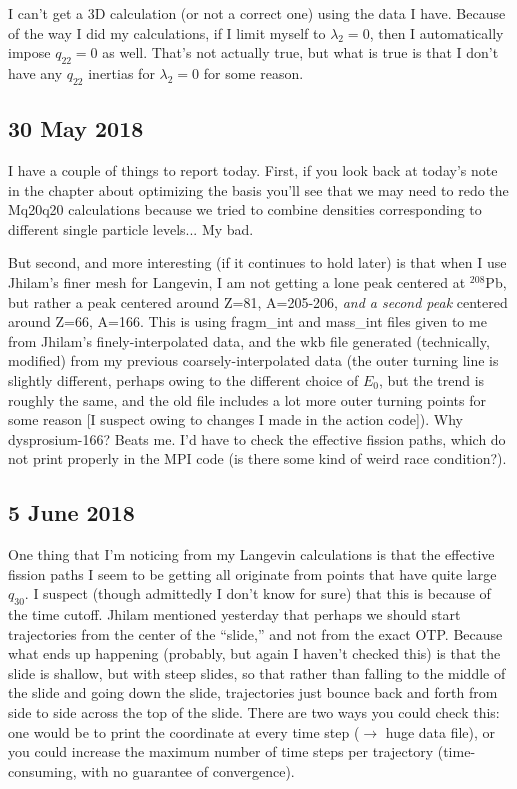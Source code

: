 \noindent I can't get a 3D calculation (or not a correct one) using the data I have. Because of the way I did my calculations, if I limit myself to $\lambda_2=0$, then I automatically impose $q_{22}=0$ as well. That's not actually true, but what is true is that I don't have any $q_{22}$ inertias for $\lambda_2=0$ for some reason.

\subsection*{30 May 2018}
I have a couple of things to report today. First, if you look back at today's note in the chapter about optimizing the basis you'll see that we may need to redo the Mq20q20 calculations because we tried to combine densities corresponding to different single particle levels... My bad.

But second, and more interesting (if it continues to hold later) is that when I use Jhilam's finer mesh for Langevin, I am not getting a lone peak centered at $^{208}$Pb, but rather a peak centered around Z=81, A=205-206, \textit{and a second peak} centered around Z=66, A=166. This is using fragm\_int and mass\_int files given to me from Jhilam's finely-interpolated data, and the wkb file generated (technically, modified) from my previous coarsely-interpolated data (the outer turning line is slightly different, perhaps owing to the different choice of $E_0$, but the trend is roughly the same, and the old file includes a lot more outer turning points for some reason [I suspect owing to changes I made in the action code]). Why dysprosium-166? Beats me. I'd have to check the effective fission paths, which do not print properly in the MPI code (is there some kind of weird race condition?).

\subsection*{5 June 2018}
One thing that I'm noticing from my Langevin calculations is that the effective fission paths I seem to be getting all originate from points that have quite large $q_{30}$. I suspect (though admittedly I don't know for sure) that this is because of the time cutoff. Jhilam mentioned yesterday that perhaps we should start trajectories from the center of the ``slide,'' and not from the exact OTP. Because what ends up happening (probably, but again I haven't checked this) is that the slide is shallow, but with steep slides, so that rather than falling to the middle of the slide and going down the slide, trajectories just bounce back and forth from side to side across the top of the slide. There are two ways you could check this: one would be to print the coordinate at every time step ($\rightarrow$ huge data file), or you could increase the maximum number of time steps per trajectory (time-consuming, with no guarantee of convergence).

